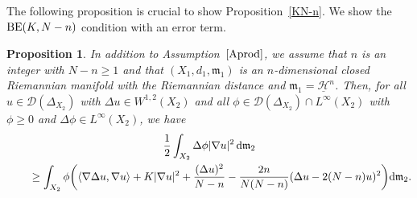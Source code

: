 \documentclass[pdftex]{sigma}
\numberwithin{equation}{section}
\newtheorem{Prop}[Thm]{Proposition}
\theoremstyle{definition}
\newcommand{\mf}{\mathfrak{m}}
\newcommand{\BE}{{\rm BE}}
\newcommand{\nHa}{\underline{\mathcal{H}}}
\newcommand{\D}{\mathcal{D}}
\begin{document}
The following proposition is crucial to show Proposition~\ref{KN-n}.
We show the $\BE(K,N-n)$ condition with an error term.
\begin{Prop}\label{preBE}
In addition to Assumption~$\ref{Aprod}$, we assume that $n$ is an integer with $N-n\geq 1$ and that $(X_1,d_1,\mf_1)$ is an $n$-dimensional closed Riemannian manifold with the Riemannian distance and $\mf_1=\nHa^n$.
Then, for all $u\in\D(\Delta_{X_2})$ with $\Delta u\in W^{1,2}(X_2)$ and all $\phi\in\D(\Delta_{X_2})\cap L^\infty(X_2)$ with $\phi\geq0$ and $\Delta \phi\in L^\infty(X_2)$, we have
\begin{gather*}
\frac{1}{2}\int_{X_2}\Delta \phi|\nabla u|^2 \,{\rm d}\mf_2
\\ \qquad
{}\geq \int_{X_2} \phi\bigg(\langle\nabla \Delta u,\nabla u\rangle+K|\nabla u|^2+\frac{(\Delta u)^2}{N-n}-\frac{2n}{N(N-n)}(\Delta u-2(N-n)u)^2\bigg) {\rm d}\mf_2.
\end{gather*}
\end{Prop}
\end{document}
